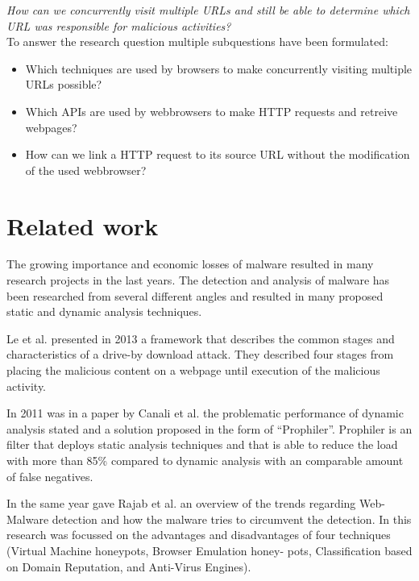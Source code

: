 \documentclass{scrartcl}
\begin{document}
\textit{How can we concurrently visit multiple URLs and still be able to determine which URL was responsible for malicious activities?}\\

To answer the research question multiple subquestions have been formulated:
\begin{itemize}
\item Which techniques are used by browsers to make concurrently visiting multiple URLs possible?
\item Which APIs are used by webbrowsers to make HTTP requests and retreive webpages?
\item How can we link a HTTP request to its source URL without the modification of the used webbrowser?
\end{itemize}

\section{Related work}
The growing importance and economic losses of malware resulted in many research projects in the last years. The detection and analysis of malware has been researched from several different angles and resulted in many proposed static and dynamic analysis techniques.

Le et al. \cite{Le2013} presented in 2013 a framework that describes the common stages and characteristics of a drive-by download attack. They described four stages from placing the malicious content on a webpage until execution of the malicious activity.

In 2011 was in a paper \cite{Canali2011} by Canali et al. the problematic performance of dynamic analysis stated and a solution proposed in the form of ``Prophiler''. Prophiler is an filter that deploys static analysis techniques and that is able to reduce the load with more than 85\% compared to dynamic analysis with an comparable amount of false negatives.

In the same year gave Rajab et al. \cite{Rajab11trendsin} an overview of the trends regarding Web-Malware detection and how the malware tries to circumvent the detection. In this research was focussed on the advantages and disadvantages of four techniques (Virtual Machine honeypots, Browser Emulation honey- pots, Classification based on Domain Reputation, and Anti-Virus Engines). 

\end{document}
